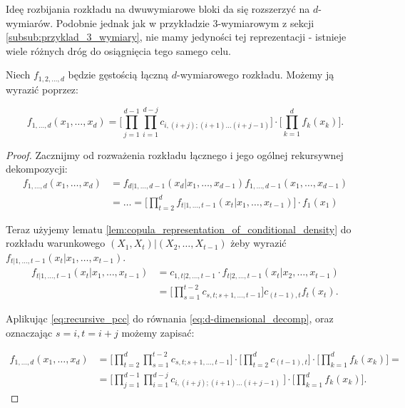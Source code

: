 Ideę rozbijania rozkładu na dwuwymiarowe bloki da się rozszerzyć na $d$-wymiarów. Podobnie jednak jak w przykładzie 3-wymiarowym z sekcji \ref{subsub:przyklad_3_wymiary}, nie mamy jedyności tej reprezentacji - istnieje wiele różnych dróg do osiągnięcia tego samego celu. 

\begin{thm}
	Niech $f_{1,2,\dots,d}$ będzie gęstością łączną $d$-wymiarowego rozkładu. Możemy ją wyrazić poprzez:
	
	\begin{equation}
		f_{1,\dots, d}(x_1, \dots, x_d) = \bigg[ \prod_{j=1}^{d-1} \prod_{i=1}^{d-j} c_{i, (i+j); (i+1)\dots(i+j-1)} \bigg] \cdot \bigg[ \prod_{k=1}^{d}f_k(x_k)\bigg].
		\label{eq:recursive_pcc}
	\end{equation}
\end{thm}
\begin{proof}
	Zacznijmy od rozważenia rozkładu łącznego i jego ogólnej rekursywnej dekompozycji:
\begin{equation}
	\begin{split}
		f_{1, \dots, d}(x_1, \dots, x_d) &= f_{d|1 , \dots, d-1}(x_d|x_1, \dots, x_{d-1})f_{1,\dots,d-1}(x_1, \dots, x_{d-1})\\
		&=\dots= \bigg[\prod_{t=2}^{d}f_{t|1,\dots,t-1}(x_t|x_1, \dots, x_{t-1})\bigg]\cdot f_1(x_1)
	\end{split}
	\label{eq:d-dimensional_decomp}
\end{equation}

Teraz użyjemy lematu \ref{lem:copula_representation_of_conditional_density} do rozkładu warunkowego $(X_1, X_t) | (X_2, \dots, X_{t-1})$ żeby wyrazić $f_{t|1,\dots,t-1}(x_t|x_1,\dots,x_{t-1})$.
	\begin{equation}
	\begin{split}
	f_{t|1,\dots,t-1}(x_t|x_1,\dots,x_{t-1})&= c_{1,t|2,\dots,t-1}\cdot f_{t|2,\dots,t-1}(x_t|x_2,\dots,x_{t-1})  \\
	& = \bigg[ \prod_{s=1}^{t-2} c_{s,t;s+1,\dots,t-1} \bigg] c_{(t-1), t} f_t(x_t).	
	\end{split}
	\end{equation}

Aplikując \ref{eq:recursive_pcc} do równania \ref{eq:d-dimensional_decomp}, oraz oznaczając $s=i, t=i+j$ możemy zapisać:

\begin{equation*}
	\begin{split}
		f_{1, \dots, d}(x_1, \dots, x_d) &= \bigg[\prod_{t=2}^{d}\prod_{s=1}^{t-2} c_{s,t;s+1,\dots,t-1}\bigg] \cdot \bigg[ \prod_{t=2}^{d}c_{(t-1), t} \bigg] \cdot \bigg[ \prod_{k=1}^{d}f_{k}(x_k) \bigg] = \\
		& = \bigg[\prod_{j=1}^{d-1}\prod_{i=1}^{d-j}c_{i,(i+j);(i+1)\dots(i+j-1)}\ \bigg] \cdot \bigg[\prod_{k=1}^{d}f_k(x_k)\bigg].
	\end{split}
\end{equation*}
\end{proof}

